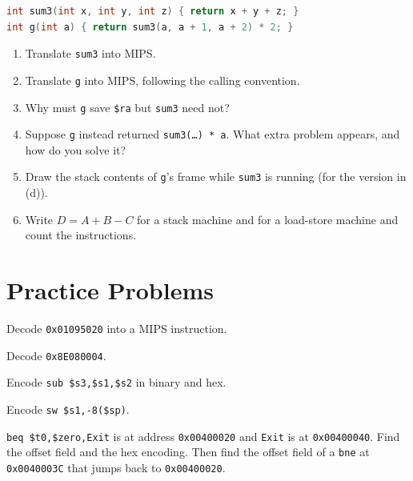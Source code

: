 \documentclass[11pt]{article}
\begin{document}
\begin{exercise}\label{x:proc}
\leavevmode
\begin{lstlisting}[language=C,keywords={int,return}]
int sum3(int x, int y, int z) { return x + y + z; }
int g(int a) { return sum3(a, a + 1, a + 2) * 2; }
\end{lstlisting}
\begin{enumerate}[label=(\alph*),leftmargin=*]
  \item Translate \texttt{sum3} into MIPS.
  \item Translate \texttt{g} into MIPS, following the calling convention.
  \item Why must \texttt{g} save \texttt{\$ra} but \texttt{sum3} need not?
  \item Suppose \texttt{g} instead returned \texttt{sum3(\dots) * a}. What
  extra problem appears, and how do you solve it?
  \item Draw the stack contents of \texttt{g}'s frame while \texttt{sum3} is
  running (for the version in (d)).
  \item Write $D = A + B - C$ for a stack machine and for a load-store
  machine and count the instructions.
\end{enumerate}
\end{exercise}

\section{Practice Problems}

\begin{exercise}\label{p:dec1}
Decode \texttt{0x01095020} into a MIPS instruction.
\end{exercise}

\begin{exercise}\label{p:dec2}
Decode \texttt{0x8E080004}.
\end{exercise}

\begin{exercise}\label{p:enc1}
Encode \texttt{sub \$s3,\$s1,\$s2} in binary and hex.
\end{exercise}

\begin{exercise}\label{p:enc2}
Encode \texttt{sw \$s1,-8(\$sp)}.
\end{exercise}

\begin{exercise}\label{p:branch}
\texttt{beq \$t0,\$zero,Exit} is at address \texttt{0x00400020} and
\texttt{Exit} is at \texttt{0x00400040}. Find the offset field and the hex
encoding. Then find the offset field of a \texttt{bne} at
\texttt{0x0040003C} that jumps back to \texttt{0x00400020}.
\end{exercise}
\end{document}
